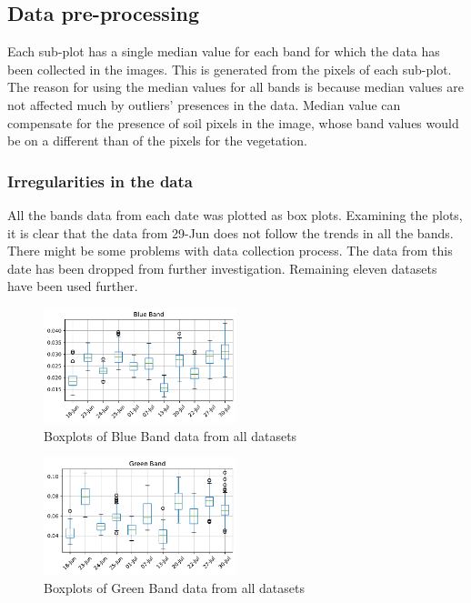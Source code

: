\documentclass[sigconf, nonacm, natbib, screen, balance=False]{acmart}
\begin{document}
\begin{table}[h!]
\begin{tabular}{|c|c|c|c|}
  \end{tabular}
\end{table}


\subsection{Data pre-processing}\label{sec:preprocessing}

Each sub-plot has a single median value for each band for which the data has been collected in the images. This is generated from the pixels of each sub-plot. The reason for using the median values for all bands is because median values are not affected much by outliers' presences in the data. Median value can compensate for the presence of soil pixels in the image, whose band values would be on a different than of the pixels for the vegetation.


\subsubsection{Irregularities in the data}\label{sec:nan}

All the bands data from each date was plotted as box plots. Examining the plots, it is clear that the data from 29-Jun does not follow the trends in all the bands. There might be some problems with data collection process. The data from this date has been dropped from further investigation. Remaining eleven datasets have been used further.

\begin{figure}[!h]
   \hspace*{-0.25in}
   \includegraphics[width=0.5\textwidth, angle=0,]{Blue.pdf}
  \caption{Boxplots of Blue Band data from all datasets}
  \label{fig:blue}
\end{figure}

\begin{figure}[!h]
   \hspace*{-0.25in}
   \includegraphics[width=0.5\textwidth, angle=0,]{Green.pdf}
  \caption{Boxplots of Green Band data from all datasets}
  \label{fig:green}
\end{figure}
\end{document}
